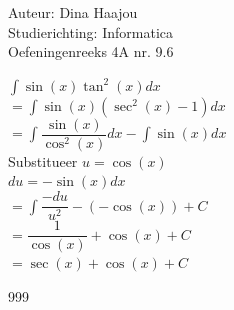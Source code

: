 \documentclass[a4paper]{article}
\begin{document}
\noindent \large Auteur: Dina Haajou \\
\noindent \large Studierichting: Informatica \\
\noindent \large Oefeningenreeks 4A nr. 9.6 \\

\medskip

\normalsize

$ \displaystyle\int \sin(x) \tan^2(x) dx $ \\

$= \displaystyle\int \sin(x)(\sec^2(x) - 1) dx $ \\

$= \displaystyle\int \dfrac{\sin(x)}{\cos^2(x)} dx - \displaystyle\int \sin(x) dx $ \\

Substitueer $u = \cos(x)$ \\

$du = -\sin(x) dx$ \\

$= \displaystyle\int \dfrac{-du}{u^2} - (-\cos(x)) + C $ \\

$= \dfrac{1}{\cos(x)} + \cos(x) + C $ \\

$= \sec(x) + \cos(x) + C$ \\

\begin{thebibliography}{999}
\end{thebibliography}
\end{document}
